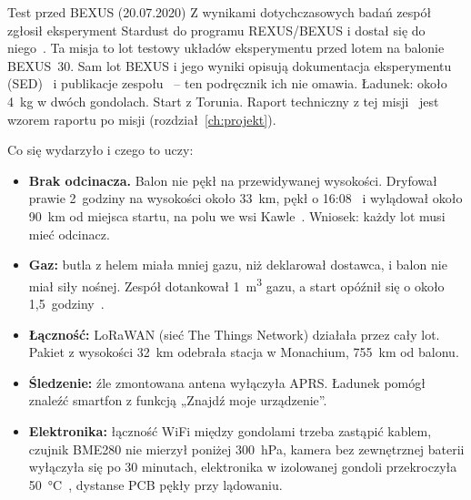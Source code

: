 \clearpage
\begin{sekcja}{Test przed BEXUS (20.07.2020)}
Z wynikami dotychczasowych badań zespół zgłosił eksperyment Stardust do programu REXUS/BEXUS i dostał się do niego~\cite{blogbexus}. Ta misja to lot testowy układów eksperymentu przed lotem na balonie BEXUS~30. Sam lot BEXUS i jego wyniki opisują dokumentacja eksperymentu (SED)~\cite{sed} i publikacje zespołu~\cite{iac2023,pac2024} -- ten podręcznik ich nie omawia. Ładunek: około \SI{4}{kg} w dwóch gondolach. Start z Torunia. Raport techniczny z tej misji~\cite{raport2020} jest wzorem raportu po misji (rozdział~\ref{ch:projekt}).

Co się wydarzyło i czego to uczy:
\begin{itemize}
  \item \textbf{Brak odcinacza.} Balon nie pękł na przewidywanej wysokości. Dryfował prawie 2~godziny na wysokości około \SI{33}{km}, pękł o 16:08~\cite{raport2020} i wylądował około \SI{90}{km} od miejsca startu, na polu we wsi Kawle~\cite{fbstardust}. Wniosek: każdy lot musi mieć odcinacz.
  \item \textbf{Gaz:} butla z helem miała mniej gazu, niż deklarował dostawca, i balon nie miał siły nośnej. Zespół dotankował \SI{1}{m^3} gazu, a start opóźnił się o około 1,5~godziny~\cite{raport2020}.
  \item \textbf{Łączność:} LoRaWAN (sieć The Things Network) działała przez cały lot. Pakiet z wysokości \SI{32}{km} odebrała stacja w Monachium, \SI{755}{km} od balonu.
  \item \textbf{Śledzenie:} źle zmontowana antena wyłączyła APRS. Ładunek pomógł znaleźć smartfon z funkcją „Znajdź moje urządzenie”.
  \item \textbf{Elektronika:} łączność WiFi między gondolami trzeba zastąpić kablem, czujnik BME280 nie mierzył poniżej \SI{300}{hPa}, kamera bez zewnętrznej baterii wyłączyła się po 30 minutach, elektronika w izolowanej gondoli przekroczyła \SI{50}{\degreeCelsius}~\cite{praca2022}, dystanse PCB pękły przy lądowaniu.
\end{itemize}

\end{sekcja}

